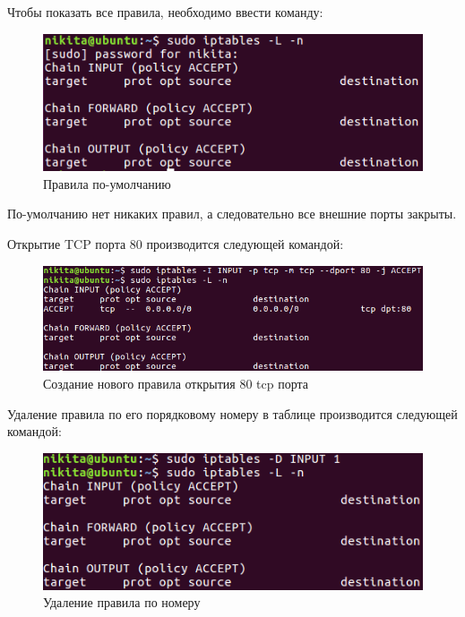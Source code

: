 \documentclass[14pt,a4paper,report]{report}
\begin{document}
Чтобы показать все правила, необходимо ввести команду:

\begin{figure}[h!]
	\centering
	\includegraphics[scale = 1.15]{images/1.png}
	\caption{Правила по-умолчанию}
	\label{image:1}
\end{figure}

По-умолчанию нет никаких правил, а следовательно все внешние порты закрыты.

Открытие TCP порта 80 производится следующей командой:

\begin{figure}[h!]
	\centering
	\includegraphics[scale = 0.95]{images/2.png}
	\caption{Создание нового правила открытия 80 tcp порта}
	\label{image:2}
\end{figure}

\clearpage

Удаление правила по его порядковому номеру в таблице производится следующей командой:

\begin{figure}[h!]
	\centering
	\includegraphics[scale = 1.25]{images/3.png}
	\caption{Удаление правила по номеру}
	\label{image:3}
\end{figure}
\end{document}
